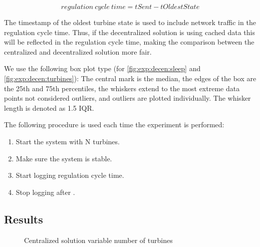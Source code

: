 $$regulation~cycle~time=tSent-tOldestState$$

The timestamp of the oldest turbine state is used to include network traffic in the regulation cycle time. Thus, if the decentralized solution is using cached data this will be reflected in the regulation cycle time, making the comparison between the centralized and decentralized solution more fair. 

We use the following box plot type (for \cref{fig:exp:decen:sleep} and \cref{fig:exp:decen:turbines}): The central mark is the median, the edges of the box are the 25th and 75th percentiles, the whiskers extend to the most extreme data points not considered outliers, and outliers are plotted individually. The whisker length is denoted as 1.5 IQR. 

The following procedure is used each time the experiment is performed:

\begin{minipage}{\textwidth}
	\begin{enumerate}
		\item Start the system with N turbines.
		\item Make sure the system is stable.
		\item Start logging regulation cycle time.
		\item Stop logging after \experiemntRunTime.
		\end{enumerate}
\end{minipage}


\subsection{Results}

\begin{figure}[h!]
	\centering
%	
%	
	
	
	\caption{Centralized solution variable number of turbines}
	\label{fig:exp:cen:turbines}
\end{figure}

